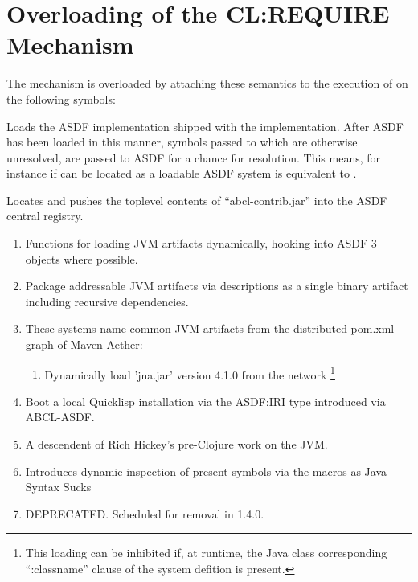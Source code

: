 \documentclass[10pt]{book}
\begin{document}
\section{Overloading of the CL:REQUIRE Mechanism}

The  mechanism is overloaded by attaching these
semantics to the execution of  on the following symbols:

\begin{description}

  \item{} 
    Loads the \textsc{ASDF} implementation shipped
    with the implementation.  After \textsc{ASDF} has been loaded in
    this manner, symbols passed to  which are
    otherwise unresolved, are passed to ASDF for a chance for
    resolution.  This means, for instance if  can be
    located as a loadable \textsc{ASDF} system  is equivalent to .

  \item{} 
    Locates and pushes the toplevel contents of
    ``abcl-contrib.jar'' into the \textsc{ASDF} central registry.  

    \begin{enumerate}
      \item {} 
        Functions for loading JVM artifacts
        dynamically, hooking into ASDF 3 objects where possible.
      \item {} 
        Package addressable JVM artifacts via
         descriptions as a single binary artifact
        including recursive dependencies.
      \item {} 
        These systems name common JVM artifacts from
        the distributed pom.xml graph of Maven Aether:
        \begin{enumerate}
          \item {} 
            Dynamically load 'jna.jar' version 4.1.0
            from the network \footnote{This loading can be inhibited
              if, at runtime, the Java class corresponding
              ``:classname'' clause of the system defition is present.}
        \end{enumerate}
      \item {} Boot a local Quicklisp installation
        via the ASDF:IRI type introduced via ABCL-ASDF.

      \item {} A descendent of Rich Hickey's pre-Clojure work
        on the JVM.
      \item {} Introduces dynamic inspection of present
        symbols via the  macros as Java Syntax
        Sucks
      \item {} DEPRECATED.  Scheduled for removal in 1.4.0.
\end{enumerate}

\end{description}
\end{document}
